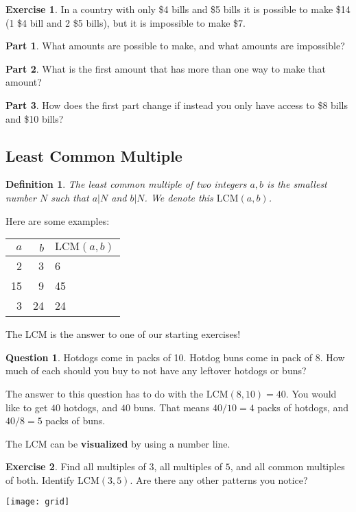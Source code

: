\documentclass[11pt]{article}
\newtheorem{dfn}[thm]{Definition}
\theoremstyle{definition}
\newtheorem{exercise}{Exercise}
\newtheorem{question}[thm]{Question}
\numberwithin{thm}{section}
\begin{document}
\begin{exercise} In a country with only \$4 bills and \$5 bills it is possible to make \$14 (1 \$4 bill and 2 \$5 bills), but it is impossible to make \$7.

\textbf{Part 1}. What amounts are possible to make, and what amounts are impossible?

\textbf{Part 2}. What is the first amount that has more than one way to make that amount?

\textbf{Part 3}. How does the first part change if instead you only have access to \$8 bills and \$10 bills?
\end{exercise}

\subsection{Least Common Multiple}

\begin{dfn} The least common multiple of two integers $a,b$ is the smallest number $N$ such that $a | N$ and $b | N$. We denote this $\text{LCM}(a,b)$.
\end{dfn}

Here are some examples:

\begin{table}[!ht]
\begin{tabular}{r|r|l}
$a$ & $b$ & $\text{LCM}(a,b)$ \\\hline
2   & 3   & 6                 \\
15  & 9   & 45                \\
3   & 24  & 24               
\end{tabular}
\end{table}

The LCM is the answer to one of our starting exercises!

\begin{question} Hotdogs come in packs of 10. Hotdog buns come in pack of 8. How much of each should you buy to not have any leftover hotdogs or buns?
\end{question}

The answer to this question has to do with the $\text{LCM}(8,10) = 40$. You would like to get $40$ hotdogs, and $40$ buns. That means $40/10 = 4$ packs of hotdogs, and $40/8 = 5$ packs of buns.

The LCM can be \textbf{visualized} by using a number line.

\begin{exercise} Find all multiples of $3$, all multiples of $5$, and all common multiples of both. Identify $\text{LCM}(3,5)$. Are there any other patterns you notice?
\begin{center}
\texttt{[image: grid]}
\end{center}
\end{exercise}
\end{document}
